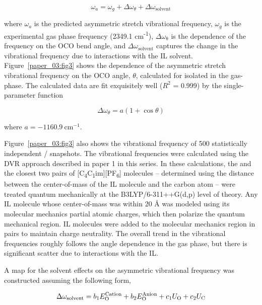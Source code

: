 \documentclass[]{article}
\begin{document}
\begin{equation}
  \label{paper_03:eq:1}
  \omega_{a} = \omega_{g} + \Delta\omega_{\theta} + \Delta\omega_{\text{solvent}}
\end{equation}

where \(\omega_{a}\) is the predicted  asymmetric stretch vibrational frequency, \(\omega_{g}\) is the experimental gas phase frequency (2349.1 cm\textsuperscript{-1}), \(\Delta\omega_{\mathrm{\theta}}\) is the dependence of the frequency on the OCO bend angle, and \(\Delta\omega_{\mathrm{\text{solvent}}}\) captures the change in the vibrational frequency due to interactions with the IL solvent. Figure~\ref{paper_03:fig3} shows the dependence of the  asymmetric stretch vibrational frequency on the OCO angle, \(\theta\), calculated for  isolated in the gas-phase.  The calculated data are fit exquisitely well (\(R^{2}\) = 0.999) by the single-parameter function

\begin{equation}
  \label{paper_03:eq:2}
  \Delta\omega_{\theta} = a(1 + \cos{\theta})
\end{equation}

where \(a = -1160.9\ \mathrm{cm}^{\mathrm{-1}}\).

Figure~\ref{paper_03:fig3} also shows the vibrational frequency of 500 statistically independent /\ce{[C4C1im][PF6]} snapshots. The vibrational frequencies were calculated using the DVR approach described in paper 1 in this series. In these calculations, the  and the closest two pairs of {[}C­\textsubscript{4}C\textsubscript{1}im{]}{[}PF\textsubscript{6}{]} molecules -- determined using the distance between the center-of-mass of the IL molecule and the  carbon atom -- were treated quantum mechanically at the B3LYP/6-311++G(d,p) level of theory. Any IL molecule whose center-of-mass was within 20 \AA{} was modeled using its molecular mechanics partial atomic charges, which then polarize the quantum mechanical region. IL molecules were added to the molecular mechanics region in pairs to maintain charge neutrality. The overall trend in the vibrational frequencies roughly follows the angle dependence in the gas phase, but there is significant scatter due to interactions with the IL.

A map for the solvent effects on the asymmetric  vibrational frequency was constructed assuming the following form,

\begin{equation}
  \label{paper_03:eq:3}
  \Delta\omega_{\text{solvent}} = b_{1}E_{\ce{O}}^{\text{Cation}} + b_{2}E_{\ce{O}}^{\text{Anion}} + c_{1}U_{\ce{O}} + c_{2}U_{\ce{C}}
\end{equation}
\end{document}
